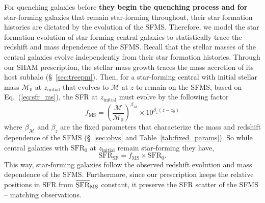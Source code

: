 \documentclass[iop,apj,tighten,twocolappendix,numberedappendix]{emulateapj}
\newcommand{\beq}{\begin{equation}}
\newcommand{\eeq}{\end{equation}}
\newcommand{\avgSFR}{\overline{\raisebox{0pt}[1.2\height]{SFR}}}
\newcommand{\SFR}{\mathrm{SFR}}
\newcommand{\zinit}{z_\mathrm{initial}}
\begin{document}
For quenching galaxies before 
{\bf \color{dred}
they begin the quenching process and for 
}
star-forming galaxies that remain star-forming throughout, 
their star formation histories are dictated by the evolution 
of the SFMS. Therefore, we model the star formation evolution of star-forming 
central galaxies to statistically trace the redshift and mass 
dependence of the SFMS. Recall that the stellar masses of the central galaxies
evolve independently from their star formation histories.
Through our SHAM prescription, the stellar mass growth traces 
the mass accretion of its host subhalo (\S~\ref{sec:treepm}).
Then, for a star-forming central with initial stellar mass 
$\mathcal{M}_0$ at $\zinit$ that evolves to $\mathcal{M}$ 
at $z$ to remain on the SFMS, based on Eq.~(\ref{eq:sfr_ms}), 
the SFR at $\zinit$ must evolve by the following factor  
\beq \label{eq:delta_sfr_ms}
f_\mathrm{MS} = \left(\frac{\mathcal{M}}{\mathcal{M}_0}\right)^{\beta_\mathcal{M}} \times
10^{\beta_z (z - z_0)}
\eeq
where $\beta_\mathcal{M}$ and $\beta_z$ are the fixed parameters 
that characterize the mass and redshift dependence of the SFMS 
(\S~\ref{sec:obvs} and Table~\ref{tab:fixed_params}). So
while central galaxies with $\SFR_0$ at $\zinit$ remain 
star-forming they have, 
\beq
\SFR_\mathrm{SF} = f_\mathrm{MS} \times \SFR_0.
\eeq
This way, star-forming galaxies follow the observed redshift 
evolution and mass dependence of the SFMS. Furthermore, since 
our prescription keeps the relative positions in SFR from 
$\avgSFR_\mathrm{MS}$ constant, it preserve the SFR scatter 
of the SFMS -- matching observations. 
\end{document}
